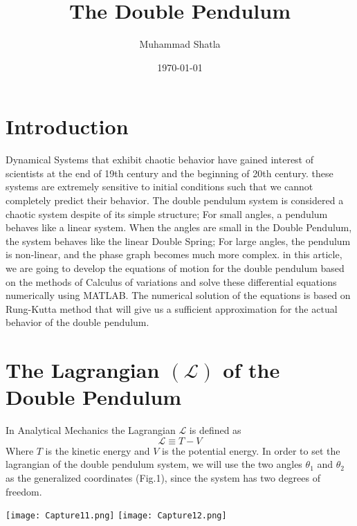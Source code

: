 \documentclass[11]{article}
\begin{document}
\vspace{5cm}
\title{The Double Pendulum}
\author{Muhammad Shatla}
\date{\today}
\maketitle
\newpage
\tableofcontents

\newpage
\section{Introduction}
\setlength{\parindent}{5ex}
Dynamical Systems that exhibit chaotic behavior have gained interest of scientists at the end of 19th century and the beginning of 20th century. these systems are extremely sensitive to initial conditions such that we cannot completely predict their behavior. The double pendulum system is considered a chaotic system despite of its simple structure; For small angles, a pendulum behaves like a linear system. When the angles are small in the Double Pendulum, the system behaves like the linear Double Spring; For large angles, the pendulum is non-linear, and the phase graph becomes much more complex. in this article, we are going to develop the equations of motion for the double pendulum based on the methods of Calculus of variations and solve these differential equations numerically using MATLAB. The numerical solution of the equations is based on Rung-Kutta method that will give us a sufficient approximation for the actual behavior of the double pendulum.
   

   
   \section{The Lagrangian $(\mathcal{L})$ of the Double Pendulum }
   
   In Analytical Mechanics the Lagrangian $\mathcal{L}$ is defined as $$\mathcal{L}\equiv T-V$$
   Where $T$ is the kinetic energy and $V$ is the potential energy. In order to set the lagrangian of the double pendulum system, we will use the two angles $\theta_{1}$ and $\theta_{2}$ as the generalized coordinates (Fig.1), since the system has two degrees of freedom. 
   \\
   \begin{center}
\texttt{[image: Capture11.png]}
\texttt{[image: Capture12.png]}
\end{center}
\end{document}
